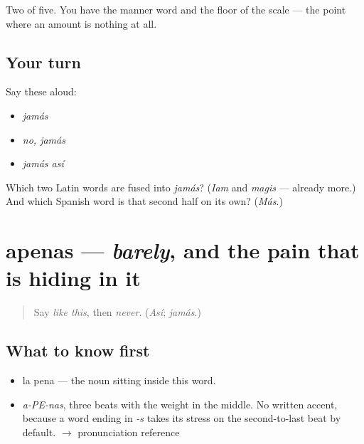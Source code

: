 \begin{grammarlens}[title={What you've built}]
Two of five. You have the manner word and the floor of the scale — the point where an amount is nothing at all.
\end{grammarlens}

\subsection*{Your turn}
Say these aloud:

\begin{itemize}
\raggedright
  \item \emph{jamás}
  \item \emph{no, jamás}
  \item \emph{jamás así}
\end{itemize}

\begin{tcolorbox}[breakable,colback=teal!4,colframe=teal!35!black,title={Before you move on}]
Which two Latin words are fused into \emph{jamás}? (\emph{Iam} and \emph{magis} — already more.) And which Spanish word is that second half on its own? (\emph{Más}.)
\end{tcolorbox}
\section[apenas]{apenas — \emph{barely}, and the pain that is hiding in it}

\label{lesson:ES-C328-apenas}



\begin{quote}
Say \emph{like this}, then \emph{never}. (\emph{Así}; \emph{jamás}.)
\end{quote}

\subsection*{What to know first}
\begin{itemize}
\raggedright
  \item la pena — the noun sitting inside this word.
\end{itemize}

\begin{sounds}
\begin{itemize}
\raggedright
  \item \emph{a-PE-nas}, three beats with the weight in the middle. No written accent, because a word ending in \emph{-s} takes its stress on the second-to-last beat by default. $\to$ pronunciation reference
\end{itemize}
\end{sounds}

